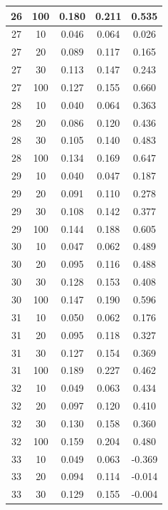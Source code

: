 \begin{longtable}{ |c|c|c|c|c| }
            26 & 100 & 0.180 & 0.211 & 0.535 \\ \hline
            27 & 10 & 0.046 & 0.064 & 0.026 \\ \hline
            27 & 20 & 0.089 & 0.117 & 0.165 \\ \hline
            27 & 30 & 0.113 & 0.147 & 0.243 \\ \hline
            27 & 100 & 0.127 & 0.155 & 0.660 \\ \hline
            28 & 10 & 0.040 & 0.064 & 0.363 \\ \hline
            28 & 20 & 0.086 & 0.120 & 0.436 \\ \hline
            28 & 30 & 0.105 & 0.140 & 0.483 \\ \hline
            28 & 100 & 0.134 & 0.169 & 0.647 \\ \hline
            29 & 10 & 0.040 & 0.047 & 0.187 \\ \hline
            29 & 20 & 0.091 & 0.110 & 0.278 \\ \hline
            29 & 30 & 0.108 & 0.142 & 0.377 \\ \hline
            29 & 100 & 0.144 & 0.188 & 0.605 \\ \hline
            30 & 10 & 0.047 & 0.062 & 0.489 \\ \hline
            30 & 20 & 0.095 & 0.116 & 0.488 \\ \hline
            30 & 30 & 0.128 & 0.153 & 0.408 \\ \hline
            30 & 100 & 0.147 & 0.190 & 0.596 \\ \hline
            31 & 10 & 0.050 & 0.062 & 0.176 \\ \hline
            31 & 20 & 0.095 & 0.118 & 0.327 \\ \hline
            31 & 30 & 0.127 & 0.154 & 0.369 \\ \hline
            31 & 100 & 0.189 & 0.227 & 0.462 \\ \hline
            32 & 10 & 0.049 & 0.063 & 0.434 \\ \hline
            32 & 20 & 0.097 & 0.120 & 0.410 \\ \hline
            32 & 30 & 0.130 & 0.158 & 0.360 \\ \hline
            32 & 100 & 0.159 & 0.204 & 0.480 \\ \hline
            33 & 10 & 0.049 & 0.063 & -0.369 \\ \hline
            33 & 20 & 0.094 & 0.114 & -0.014 \\ \hline
            33 & 30 & 0.129 & 0.155 & -0.004 \\ \hline

\end{longtable}
